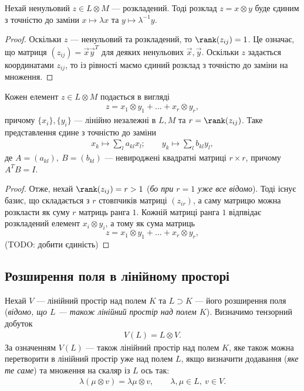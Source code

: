 \documentclass{math_library}
\begin{document}
\begin{remark}
Нехай ненульовий $z \in L \otimes M$ --- розкладений. Тоді розклад $z = x \otimes y$ буде єдиним з точністю до заміни $x \mapsto \lambda x$ та $y \mapsto \lambda^{-1}y$.
\end{remark}

\begin{proof}
Оскільки $z$ --- ненульовий та розкладений, то $\rank (z_{ij}) = 1$. Це означає, що матриця $(z_{ij}) = \vec{x} \vec{y}^T$ для деяких ненульових $\vec{x},\vec{y}$. Оскільки $z$ задається координатами $z_{ij}$, то із рівності маємо єдиний розклад з точністю до заміни на множення.
\end{proof}

\begin{proposition}
Кожен елемент $z \in L \otimes M$ подається в вигляді
\begin{align*}
z = x_1 \otimes y_1 + \dots + x_r \otimes y_r,
\end{align*}
причому $\{x_i\},\{y_i\}$ --- лінійно незалежні в $L,M$ та $r = \rank (z_{ij})$. Таке представлення єдине з точністю до заміни
\begin{align*}
x_k \mapsto \sum_l a_{kl} x_l; \qquad y_k \mapsto \sum_l b_{kl} y_l,
\end{align*}
де $A = (a_{kl}),\ B = (b_{kl})$ --- невироджені квадратні матриці $r \times r$, причому $A^T B = I$.
\end{proposition}

\begin{proof}
Отже, нехай $\rank (z_{ij}) = r > 1$ (\textit{бо при $r=1$ уже все відомо}). Тоді існує базис, що складається з $r$ стовпчиків матриці $(z_{ir})$, а саму матрицю можна розкласти як суму $r$ матриць ранга $1$. Кожній матриці ранга $1$ відпвідає розкладений елемент $x_i \otimes y_i$, а тому як сума матриць
\[
z = x_1 \otimes y_1 + \dots + x_r \otimes y_r,
\]
(TODO: добити єдиність)
\end{proof}

\iffalse
\subsection{Розширення поля в лінійному просторі}
Нехай $V$ --- лінійний простір над полем $K$ та $L \supset K$ --- його розширення поля (\textit{відомо, що $L$ --- також лінійний простір над полем $K$}). Визначимо тензорний добуток
\begin{align*}
V(L) = L \otimes V.
\end{align*} 
За означенням $V(L)$ --- також лінійний простір над полем $K$, яке також можна перетворити в лінійний простір уже над полем $L$, якщо визначити додавання (\textit{яке те саме}) та множення на скаляр із $L$ ось так:
\begin{align*}
\lambda (\mu \otimes v) = \lambda \mu \otimes v,\qquad \lambda,\mu \in L,\ v \in V.
\end{align*}
\end{document}
